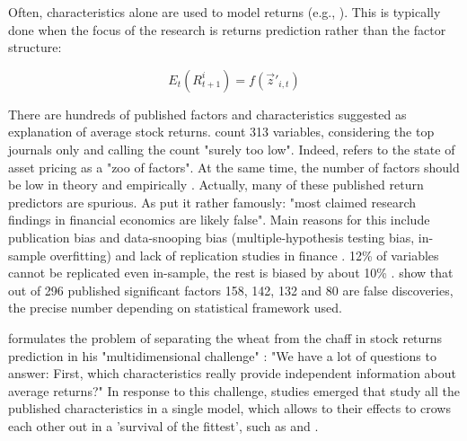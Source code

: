 			Often, characteristics alone are used to model returns (e.g., \cite{gu2020empirical, bryzgalova2019forest, tobek2020does}). This is typically done when the focus of the research is returns prediction rather than the factor structure:
			
			\begin{equation}
				E_t(R^i_{t+1}) = f(\vec{z}'_{i,t})
			\end{equation}
			
			
			There are hundreds of published factors and characteristics suggested as explanation of average stock returns. \cite{harvey2016and} count 313 variables, considering the top journals only and calling the count "surely too low". Indeed, \cite{2011presidential} refers to the state of asset pricing as a "zoo of factors". At the same time, the number of factors should be low in theory \citep{cochrane2011presidential} and empirically \citep{ahn2012determining}. Actually, many of these published return predictors are spurious. As \cite[p.~5]{harvey2016and} put it rather famously: "most claimed research findings in financial economics are likely false". Main reasons for this include publication bias and data-snooping bias (multiple-hypothesis testing bias, in-sample overfitting) and lack of replication studies in finance \citep{harvey2016and, mclean2016does}. 12\% of variables cannot be replicated even in-sample, the rest is biased by about 10\% \citep{mclean2016does}. \cite{harvey2016and} show that out of 296 published significant factors 158, 142, 132 and 80 are false discoveries, the precise number depending on statistical framework used.
			
			\citeauthor{cochrane2011presidential} formulates the problem of separating the wheat from the chaff in stock returns prediction in his "multidimensional challenge" \citep[p.~1060]{cochrane2011presidential}: "We have a lot of questions to answer: First, which characteristics really provide independent information about average returns?" In response to this challenge, studies emerged that study all the published characteristics in a single model, which allows to their effects to crows each other out in a 'survival of the fittest', such as \cite{gu2020empirical} and \cite{tobek2020does}. 
		
